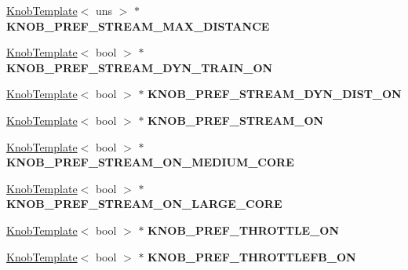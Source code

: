 \begin{DoxyCompactItemize}
\item 
\hypertarget{classall__knobs__c_ae48fb655a9989ca02ae06ce84bfdbfa8}{
\hyperlink{classKnobTemplate}{KnobTemplate}$<$ uns $>$ $\ast$ {\bfseries KNOB\_\-PREF\_\-STREAM\_\-MAX\_\-DISTANCE}}
\label{classall__knobs__c_ae48fb655a9989ca02ae06ce84bfdbfa8}

\item 
\hypertarget{classall__knobs__c_a259a0ddf3f456b07b769df6a0cc5b527}{
\hyperlink{classKnobTemplate}{KnobTemplate}$<$ bool $>$ $\ast$ {\bfseries KNOB\_\-PREF\_\-STREAM\_\-DYN\_\-TRAIN\_\-ON}}
\label{classall__knobs__c_a259a0ddf3f456b07b769df6a0cc5b527}

\item 
\hypertarget{classall__knobs__c_a062ca74c4d8e59b5e3353629d148b65a}{
\hyperlink{classKnobTemplate}{KnobTemplate}$<$ bool $>$ $\ast$ {\bfseries KNOB\_\-PREF\_\-STREAM\_\-DYN\_\-DIST\_\-ON}}
\label{classall__knobs__c_a062ca74c4d8e59b5e3353629d148b65a}

\item 
\hypertarget{classall__knobs__c_ae7e5226b22deca457811af4af0e09a1a}{
\hyperlink{classKnobTemplate}{KnobTemplate}$<$ bool $>$ $\ast$ {\bfseries KNOB\_\-PREF\_\-STREAM\_\-ON}}
\label{classall__knobs__c_ae7e5226b22deca457811af4af0e09a1a}

\item 
\hypertarget{classall__knobs__c_a5a74050b662055f34e99ac49bf8b5f0e}{
\hyperlink{classKnobTemplate}{KnobTemplate}$<$ bool $>$ $\ast$ {\bfseries KNOB\_\-PREF\_\-STREAM\_\-ON\_\-MEDIUM\_\-CORE}}
\label{classall__knobs__c_a5a74050b662055f34e99ac49bf8b5f0e}

\item 
\hypertarget{classall__knobs__c_ac51cf80b90f80ad108ff9b1893b56f31}{
\hyperlink{classKnobTemplate}{KnobTemplate}$<$ bool $>$ $\ast$ {\bfseries KNOB\_\-PREF\_\-STREAM\_\-ON\_\-LARGE\_\-CORE}}
\label{classall__knobs__c_ac51cf80b90f80ad108ff9b1893b56f31}

\item 
\hypertarget{classall__knobs__c_a5f5adfeea39318fdbb6cbeb97de99993}{
\hyperlink{classKnobTemplate}{KnobTemplate}$<$ bool $>$ $\ast$ {\bfseries KNOB\_\-PREF\_\-THROTTLE\_\-ON}}
\label{classall__knobs__c_a5f5adfeea39318fdbb6cbeb97de99993}

\item 
\hypertarget{classall__knobs__c_a9676c6be5fcd51ed6435c400d183fc62}{
\hyperlink{classKnobTemplate}{KnobTemplate}$<$ bool $>$ $\ast$ {\bfseries KNOB\_\-PREF\_\-THROTTLEFB\_\-ON}}
\label{classall__knobs__c_a9676c6be5fcd51ed6435c400d183fc62}


\end{DoxyCompactItemize}
